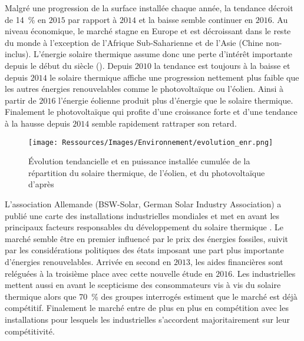 Malgré une progression de la surface installée chaque année, la tendance décroit
de \SI{14}{\percent} en $2015$ par rapport à $2014$ et la baisse semble continuer en
$2016$. Au niveau économique, le marché stagne en Europe et est décroissant dans le reste
du monde à l’exception de l’Afrique Sub-Saharienne et de l’Asie (Chine non-inclus).
L’énergie solaire thermique assume donc une perte d’intérêt importante depuis le début du siècle
(). Depuis $2010$ la tendance est toujours à la baisse
et depuis $2014$ le solaire thermique affiche une progression nettement plus faible
que les autres énergies renouvelables comme le photovoltaïque ou l’éolien. Ainsi à partir
de $2016$ l’énergie éolienne produit plus d’énergie que le solaire thermique. Finalement
le photovoltaïque qui profite d’une croissance forte et d’une tendance à la hausse depuis $2014$
semble rapidement rattraper son retard.

\begin{figure}
    \centering
    \texttt{[image: Ressources/Images/Environnement/evolution\_enr.png]}
    \caption{Évolution tendancielle et en puissance installée cumulée de la répartition
             du solaire thermique, de l’éolien, et du photovoltaïque d’après
             \textcite{Weiss2017}}
    \label{fig:tendances_enr}
\end{figure}

L’association Allemande (\textsf{BSW-Solar}, German Solar Industry Association)
a publié une carte des installations industrielles mondiales et met en avant les
principaux facteurs responsables du développement du solaire thermique \parencite{Augsten2017}.
Le  marché semble être en premier influencé par le prix des énergies fossiles, suivit par les considérations
politiques des états imposant une part plus importante d’énergies renouvelables. Arrivée
en second en $2013$, les aides financières sont reléguées à la troisième place avec
cette nouvelle étude en $2016$. Les industrielles
mettent aussi en avant le scepticisme des consommateurs vis à vis du solaire thermique
alors que \SI{70}{\percent} des groupes interrogés estiment que le marché est déjà
compétitif. Finalement le marché entre de plus en plus en compétition avec les installations  pour
lesquels les industrielles s’accordent majoritairement sur leur compétitivité.


